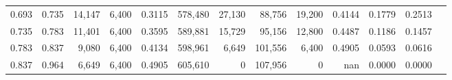 \begin{tabular}{rrrrrrrrrrrrr}
0.693 & 0.735 &  14,147 & 6,400 &                                     0.3115 & 578,480 &  27,130 &  88,756 &  19,200 & 0.4144 & 0.1779 & 0.2513 \\
0.735 & 0.783 &  11,401 & 6,400 &                                     0.3595 & 589,881 &  15,729 &  95,156 &  12,800 & 0.4487 & 0.1186 & 0.1457 \\
0.783 & 0.837 &   9,080 & 6,400 &                                     0.4134 & 598,961 &   6,649 & 101,556 &   6,400 & 0.4905 & 0.0593 & 0.0616 \\
0.837 & 0.964 &   6,649 & 6,400 &                                     0.4905 & 605,610 &       0 & 107,956 &       0 &    nan & 0.0000 & 0.0000 \\
\bottomrule
\end{tabular}
